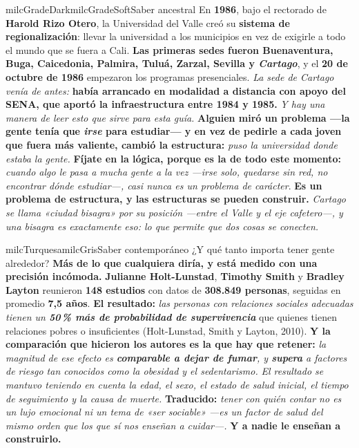 \documentclass[11pt,letterpaper]{article}
\begin{document}
\begin{softbox}{milcGradeDark}{milcGradeSoft}{Saber ancestral}
En \textbf{1986}, bajo el rectorado de \textbf{Harold Rizo Otero}, la Universidad del Valle creó su \textbf{sistema de regionalización}: llevar la universidad a los municipios en vez de exigirle a todo el mundo que se fuera a Cali. \textbf{Las primeras sedes fueron Buenaventura, Buga, Caicedonia, Palmira, Tuluá, Zarzal, Sevilla y \emph{Cartago}}, y el \textbf{20 de octubre de 1986} empezaron los programas presenciales. \emph{La sede de Cartago venía de antes:} \textbf{había arrancado en modalidad a distancia con apoyo del SENA, que aportó la infraestructura entre 1984 y 1985.} \emph{Y hay una manera de leer esto que sirve para esta guía.} \textbf{Alguien miró un problema ---la gente tenía que \emph{irse} para estudiar--- y en vez de pedirle a cada joven que fuera más valiente, \textbf{cambió la estructura}:} \emph{puso la universidad donde estaba la gente.} \textbf{Fíjate en la lógica, porque es la de todo este momento:} \emph{cuando algo le pasa a mucha gente a la vez ---irse solo, quedarse sin red, no encontrar dónde estudiar---, casi nunca es un problema de carácter}. \textbf{Es un problema de estructura, y las estructuras se pueden construir.} \emph{Cartago se llama «ciudad bisagra» por su posición ---entre el Valle y el eje cafetero---, y una bisagra es exactamente eso: lo que permite que dos cosas se conecten.}
\end{softbox}

\begin{softbox}{milcTurquesa}{milcGris}{Saber contemporáneo}
¿Y qué tanto importa tener gente alrededor? \textbf{Más de lo que cualquiera diría, y está medido con una precisión incómoda.} \textbf{Julianne Holt-Lunstad}, \textbf{Timothy Smith} y \textbf{Bradley Layton} reunieron \textbf{148 estudios} con datos de \textbf{308.849 personas}, seguidas en promedio \textbf{7,5 años}. \textbf{El resultado:} \emph{las personas con relaciones sociales adecuadas tienen un \textbf{50\,\% más de probabilidad de supervivencia}} que quienes tienen relaciones pobres o insuficientes (Holt-Lunstad, Smith y Layton, 2010). \textbf{Y la comparación que hicieron los autores es la que hay que retener:} \emph{la magnitud de ese efecto es \textbf{comparable a dejar de fumar}, y \textbf{supera} a factores de riesgo tan conocidos como la obesidad y el sedentarismo.} \emph{El resultado se mantuvo teniendo en cuenta la edad, el sexo, el estado de salud inicial, el tiempo de seguimiento y la causa de muerte.} \textbf{Traducido:} \emph{tener con quién contar no es un lujo emocional ni un tema de «ser sociable» ---es un factor de salud del mismo orden que los que sí nos enseñan a cuidar---.} \textbf{Y a nadie le enseñan a construirlo.}
\end{softbox}
\end{document}
